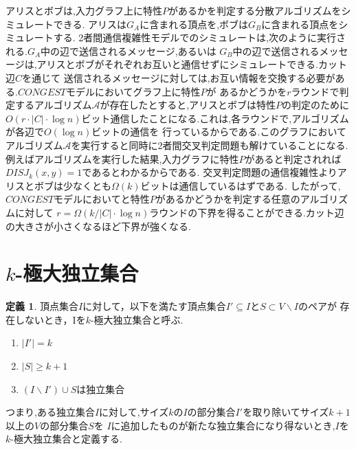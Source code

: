 \documentclass[12pt]{thesis}
\theoremstyle{definition}
\newtheorem{definition}{定義}[chapter]
\begin{document}
アリスとボブは,入力グラフ上に特性$P$があるかを判定する分散アルゴリズムをシミュレートできる.
アリスは$G_{A}$に含まれる頂点を,ボブは$G_{B}$に含まれる頂点をシミュレートする.
2者間通信複雑性モデルでのシミュレートは,次のように実行される.$G_{A}$中の辺で送信されるメッセージ,あるいは
$G_{B}$中の辺で送信されるメッセージは,アリスとボブがそれぞれお互いと通信せずにシミュレートできる.カット辺$C$を通じて
送信されるメッセージに対しては,お互い情報を交換する必要がある.$CONGEST$モデルにおいてグラフ上に特性$P$が
あるかどうかを$r$ラウンドで判定するアルゴリズム$\mathcal{A}$が存在したとすると,アリスとボブは特性$P$の判定のために
$O(r \cdot |C| \cdot \log n)$ビット通信したことになる.これは,各ラウンドで,アルゴリズムが各辺で$O(\log n)$ビットの通信を
行っているからである.このグラフにおいてアルゴリズム$\mathcal{A}$を実行すると同時に2者間交叉判定問題も解けていることになる.
例えばアルゴリズムを実行した結果,入力グラフに特性$P$があると判定されれば$DISJ_{k} (x, y)=1$であるとわかるからである.
交叉判定問題の通信複雑性よりアリスとボブは少なくとも$\Omega (k)$ビットは通信しているはずである.
したがって,$CONGEST$モデルにおいてと特性$P$があるかどうかを判定する任意のアルゴリズムに対して
$r = \Omega (k / |C| \cdot \log n)$ラウンドの下界を得ることができる.カット辺の大きさが小さくなるほど下界が強くなる.

\section{$k$-極大独立集合}

\begin{definition}
頂点集合$I$に対して，以下を満たす頂点集合$I' \subseteq I$と$S\subset V \backslash I$のペアが
存在しないとき，Iを$k$-極大独立集合と呼ぶ.
\begin{enumerate}
\item $|I'| = k$
\item $|S| \geq k + 1$
\item $(I \backslash I') \cup S$は独立集合
\end{enumerate}
\end{definition}
つまり,ある独立集合$I$に対して,サイズ$k$の$I$の部分集合$I'$を取り除いてサイズ$k + 1$以上の$V$の部分集合$S$を
$I$に追加したものが新たな独立集合になり得ないとき,$I$を$k$-極大独立集合と定義する.
\end{document}
